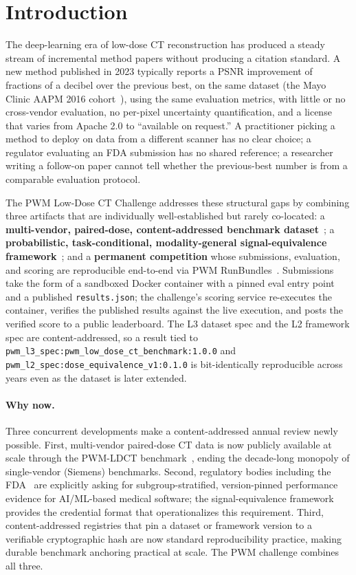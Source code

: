 \documentclass[twoside,11pt]{article}
\begin{document}
\section{Introduction}

The deep-learning era of low-dose CT reconstruction has produced a steady stream of incremental method papers without producing a citation standard. A new method published in 2023 typically reports a PSNR improvement of fractions of a decibel over the previous best, on the same dataset (the Mayo Clinic AAPM 2016 cohort~\citep{aapm2016challenge}), using the same evaluation metrics, with little or no cross-vendor evaluation, no per-pixel uncertainty quantification, and a license that varies from Apache 2.0 to ``available on request.'' A practitioner picking a method to deploy on data from a different scanner has no clear choice; a regulator evaluating an FDA submission has no shared reference; a researcher writing a follow-on paper cannot tell whether the previous-best number is from a comparable evaluation protocol.

The PWM Low-Dose CT Challenge addresses these structural gaps by combining three artifacts that are individually well-established but rarely co-located: a \textbf{multi-vendor, paired-dose, content-addressed benchmark dataset}~\citep{ws1dataset}; a \textbf{probabilistic, task-conditional, modality-general signal-equivalence framework}~\citep{ws2framework}; and a \textbf{permanent competition} whose submissions, evaluation, and scoring are reproducible end-to-end via PWM RunBundles~\citep{pwmregistry}. Submissions take the form of a sandboxed Docker container with a pinned eval entry point and a published \texttt{results.json}; the challenge's scoring service re-executes the container, verifies the published results against the live execution, and posts the verified score to a public leaderboard. The L3 dataset spec and the L2 framework spec are content-addressed, so a result tied to \texttt{pwm\_l3\_spec:pwm\_low\_dose\_ct\_benchmark:1.0.0} and \texttt{pwm\_l2\_spec:dose\_equivalence\_v1:0.1.0} is bit-identically reproducible across years even as the dataset is later extended.

\paragraph{Why now.} Three concurrent developments make a content-addressed annual review newly possible. First, multi-vendor paired-dose CT data is now publicly available at scale through the PWM-LDCT benchmark~\citep{ws1dataset}, ending the decade-long monopoly of single-vendor (Siemens) benchmarks. Second, regulatory bodies including the FDA~\citep{fda_aiml_2024} are explicitly asking for subgroup-stratified, version-pinned performance evidence for AI/ML-based medical software; the signal-equivalence framework~\citep{ws2framework} provides the credential format that operationalizes this requirement. Third, content-addressed registries that pin a dataset or framework version to a verifiable cryptographic hash are now standard reproducibility practice, making durable benchmark anchoring practical at scale. The PWM challenge combines all three.
\end{document}
